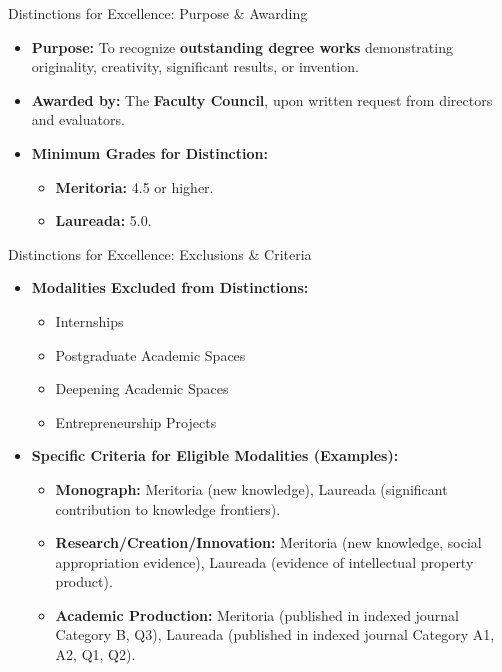             \begin{frame}{Distinctions for Excellence: Purpose \& Awarding}
              \begin{itemize}
                \item<1-> \textbf{Purpose:} To recognize \textbf{outstanding degree works} demonstrating originality, creativity, significant results, or invention.
                \item<2-> \textbf{Awarded by:} The \textbf{Faculty Council}, upon written request from directors and evaluators.
                \item<3-> \textbf{Minimum Grades for Distinction:}
                  \begin{itemize}
                    \item<4-> \textbf{Meritoria:} 4.5 or higher.
                    \item<5-> \textbf{Laureada:} 5.0.
                  \end{itemize}
              \end{itemize}
            \end{frame}

              \begin{frame}{Distinctions for Excellence: Exclusions \& Criteria}
                \begin{itemize}
                  \item<1-> \textbf{Modalities Excluded from Distinctions:}
                    \begin{itemize}
                      \item<2-> Internships
                      \item<3-> Postgraduate Academic Spaces
                      \item<4-> Deepening Academic Spaces
                      \item<5-> Entrepreneurship Projects
                    \end{itemize}
                  \item<6-> \textbf{Specific Criteria for Eligible Modalities (Examples):}
                    \begin{itemize}
                      \item<7-> \textbf{Monograph:} Meritoria (new knowledge), Laureada (significant contribution to knowledge frontiers).
                      \item<8-> \textbf{Research/Creation/Innovation:} Meritoria (new knowledge, social appropriation evidence), Laureada (evidence of intellectual property product).
                      \item<9-> \textbf{Academic Production:} Meritoria (published in indexed journal Category B, Q3), Laureada (published in indexed journal Category A1, A2, Q1, Q2).
                    \end{itemize}
                \end{itemize}
              \end{frame}

